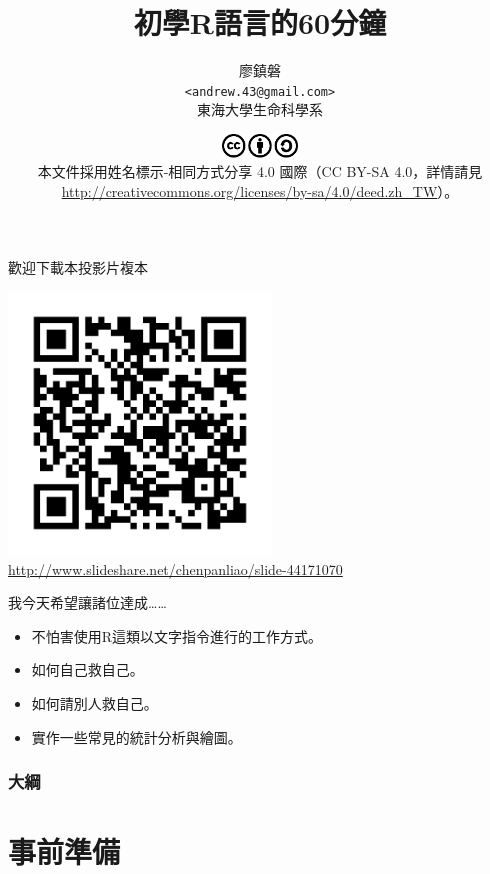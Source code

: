 \documentclass[12pt]{beamer}
\title[初學者學習R語言]{初學R語言的60分鐘}
\author[廖鎮磐]{廖鎮磐 \\ \texttt{<andrew.43@gmail.com>}\\ 東海大學生命科學系}
\institute{\normalsize 2015年3月14日於蓮華池}
\date{\scriptsize \includegraphics[width=2cm]{cc.pdf}\\
本文件採用姓名標示-相同方式分享 4.0 國際（CC BY-SA 4.0，詳情請見 \url{http://creativecommons.org/licenses/by-sa/4.0/deed.zh_TW}）。}
\begin{document}
\begin{frame}
\titlepage
\end{frame}

\begin{frame}{歡迎下載本投影片複本}
\begin{center}
\includegraphics[width=2.75in]{url.pdf}\\
\footnotesize\url{http://www.slideshare.net/chenpanliao/slide-44171070}
\end{center}
\end{frame}

\begin{frame}{我今天希望讓諸位達成\ldots\ldots}
\begin{itemize}
\item 不怕害使用R這類以文字指令進行的工作方式。
\item 如何自己救自己。
\item 如何請別人救自己。
\item 實作一些常見的統計分析與繪圖。
\end{itemize}
\end{frame}


\begin{frame}
\frametitle{大綱}
\tableofcontents
\end{frame}

\section{事前準備}\subsection{}
\end{document}
